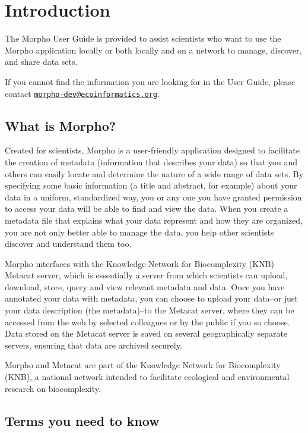 \section{Introduction}

The Morpho User Guide is provided to assist scientists who want to use
the Morpho application locally or both locally and on a network to
manage, discover, and share data sets.

If you cannot find the information you are looking for in the User
Guide, please contact \href{mailto:morpho-dev@ecoinformatics.org}
{\nolinkurl{morpho-dev@ecoinformatics.org}}.

\subsection{What is Morpho?}

Created for scientists, Morpho is a user-friendly application designed
to facilitate the creation of metadata (information that describes your
data) so that you and others can easily locate and determine the nature
of a wide range of data sets. By specifying some basic information (a
title and abstract, for example) about your data in a uniform,
standardized way, you or any one you have granted permission to access
your data will be able to find and view the data. When you create a
metadata file that explains what your data represent and how they are
organized, you are not only better able to manage the data, you help
other scientists discover and understand them too. 

Morpho interfaces with the Knowledge Network for Biocomplexity (KNB)
Metacat server, which is essentially a server from which scientists can
upload, download, store, query and view relevant metadata and data. Once
you have annotated your data with metadata, you can choose to upload
your data--or just your data description (the metadata)--to the Metacat
server, where they can be accessed from the web by selected colleagues
or by the public if you so choose. Data stored on the Metacat server is
saved on several geographically separate servers, ensuring that data are
archived securely.

Morpho and Metacat are part of the Knowledge Network for Biocomplexity
(KNB), a national network intended to facilitate ecological and
environmental research on biocomplexity.

\subsection{Terms you need to know}

